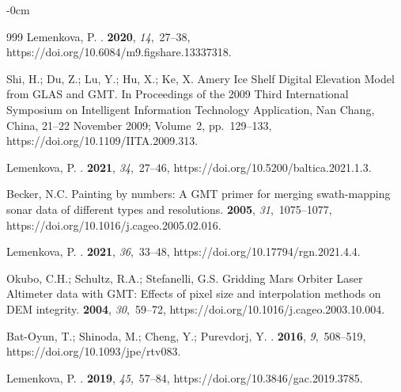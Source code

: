 \documentclass[geosciences,article,accept,pdftex,oneauthor]{Definitions/mdpi}
\begin{document}
\begin{adjustwidth}{-\extralength}{0cm}
\begin{thebibliography}{999}
Lemenkova, P.
.
 {\bf 2020}, {\em 14},~27--38, https://doi.org/10.6084/m9.figshare.13337318.

Shi, H.; Du, Z.; Lu, Y.; Hu, X.; Ke, X.
\newblock Amery Ice Shelf Digital Elevation Model from GLAS and GMT.
\newblock In Proceedings of the 2009 Third International Symposium on
  Intelligent Information Technology Application, Nan Chang, China,  21--22 November 2009; Volume~2, pp.~129--133, https://doi.org/10.1109/IITA.2009.313.

Lemenkova, P.
.
 {\bf 2021}, {\em 34},~27--46, https://doi.org/10.5200/baltica.2021.1.3.

Becker, N.C.
\newblock Painting by numbers: A GMT primer for merging swath-mapping sonar
  data of different types and resolutions.
 {\bf 2005}, {\em 31},~1075--1077, https://doi.org/10.1016/j.cageo.2005.02.016.

Lemenkova, P.
.
 {\bf 2021}, {\em 36},~33--48, https://doi.org/10.17794/rgn.2021.4.4.

Okubo, C.H.; Schultz, R.A.; Stefanelli, G.S.
\newblock Gridding Mars Orbiter Laser Altimeter data with GMT: Effects of pixel
  size and interpolation methods on DEM integrity.
 {\bf 2004}, {\em 30},~59--72, https://doi.org/10.1016/j.cageo.2003.10.004.

Bat-Oyun, T.; Shinoda, M.; Cheng, Y.; Purevdorj, Y.
.
 {\bf 2016}, {\em 9},~508--519, https://doi.org/10.1093/jpe/rtv083.

Lemenkova, P.
.
 {\bf 2019}, {\em 45},~57--84, https://doi.org/10.3846/gac.2019.3785.


\end{thebibliography}
\end{adjustwidth}
\end{document}
